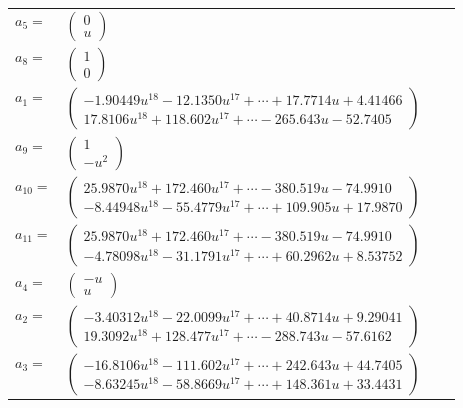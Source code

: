 \documentclass[1p]{elsarticle_modified}
\theoremstyle{definition}
\begin{document}
\begin{tabular}{m{7pt} m{180pt} m{7pt} m{180pt} }
\flushright $a_{5}=$&$\begin{pmatrix}0\\u\end{pmatrix}$ \\
\flushright $a_{8}=$&$\begin{pmatrix}1\\0\end{pmatrix}$ \\
\flushright $a_{1}=$&$\begin{pmatrix}-1.90449 u^{18}-12.1350 u^{17}+\cdots+17.7714 u+4.41466\\17.8106 u^{18}+118.602 u^{17}+\cdots-265.643 u-52.7405\end{pmatrix}$ \\
\flushright $a_{9}=$&$\begin{pmatrix}1\\- u^2\end{pmatrix}$ \\
\flushright $a_{10}=$&$\begin{pmatrix}25.9870 u^{18}+172.460 u^{17}+\cdots-380.519 u-74.9910\\-8.44948 u^{18}-55.4779 u^{17}+\cdots+109.905 u+17.9870\end{pmatrix}$ \\
\flushright $a_{11}=$&$\begin{pmatrix}25.9870 u^{18}+172.460 u^{17}+\cdots-380.519 u-74.9910\\-4.78098 u^{18}-31.1791 u^{17}+\cdots+60.2962 u+8.53752\end{pmatrix}$ \\
\flushright $a_{4}=$&$\begin{pmatrix}- u\\u\end{pmatrix}$ \\
\flushright $a_{2}=$&$\begin{pmatrix}-3.40312 u^{18}-22.0099 u^{17}+\cdots+40.8714 u+9.29041\\19.3092 u^{18}+128.477 u^{17}+\cdots-288.743 u-57.6162\end{pmatrix}$ \\
\flushright $a_{3}=$&$\begin{pmatrix}-16.8106 u^{18}-111.602 u^{17}+\cdots+242.643 u+44.7405\\-8.63245 u^{18}-58.8669 u^{17}+\cdots+148.361 u+33.4431\end{pmatrix}$ \\

\end{tabular}
\end{document}
